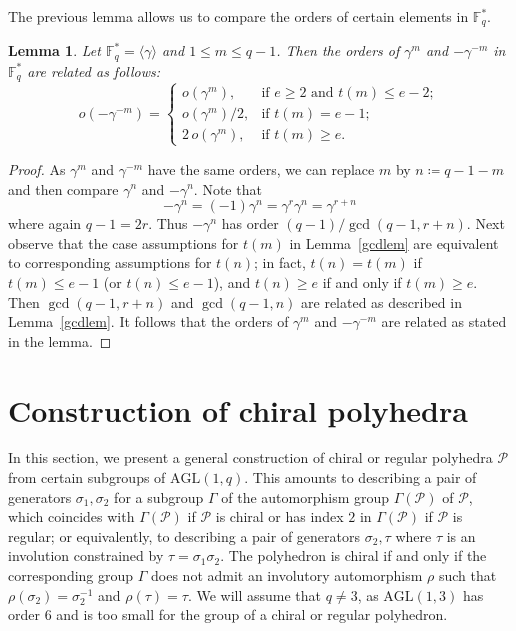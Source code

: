 \documentclass[12pt]{article}
\newtheorem{lemma}[theorem]{Lemma}
\theoremstyle{definition}\newtheorem{definition}{Definition}[section]
\begin{document}
The previous lemma allows us to compare the orders of certain elements in $\mathbb{F}_q^*$.

\begin{lemma}
\label{neggam}
Let $\mathbb{F}_q^*=\langle\gamma\rangle$ and $1\leq m\leq q-1$. Then the orders of $\gamma^m$ and $-\gamma^{-m}$ in $\mathbb{F}_q^*$ are related as follows: 
\[
	o(-\gamma^{-m}) = \begin{cases}
		o(\gamma^m), & \text{if $e \geq 2$ and $t(m) \leq e - 2$}; \\ 
		o(\gamma^m)/2, & \text{if $t(m) = e - 1$}; \\ 
		2\, o(\gamma^m), & \text{if $t(m) \geq e$}.
	\end{cases}
\]
\end{lemma}

\begin{proof}
As $\gamma^m$ and $\gamma^{-m}$ have the same orders, we can replace $m$ by $n\coloneqq q-1-m$ and then compare $\gamma^n$ and $-\gamma^n$. Note that
\[-\gamma^{n}=(-1)\gamma^{n}=\gamma^{r}\gamma^{n}=\gamma^{r+n}\]
where again $q-1=2r$. Thus $-\gamma^{n}$ has order $(q-1)/\gcd(q-1,r+n)$. Next observe that the case assumptions for $t(m)$ in Lemma~\ref{gcdlem} are equivalent to corresponding assumptions for $t(n)$; in fact, $t(n)=t(m)$ if $t(m)\leq e-1$ (or $t(n)\leq e-1$), and $t(n)\geq e$ if and only if $t(m)\geq e$. Then $\gcd(q-1,r+n)$ and $\gcd(q-1,n)$ are related as described in Lemma~\ref{gcdlem}. It follows that the orders of $\gamma^{m}$ and $-\gamma^{-m}$ are related as stated in the lemma.
\end{proof}

\section{Construction of chiral polyhedra}
\label{constr}

In this section, we present a general construction of chiral or regular polyhedra $\mathcal{P}$ from certain subgroups of $\mathrm{AGL}(1,q)$. This amounts to describing a pair of generators $\sigma_1,\sigma_2$ for a subgroup $\Gamma$ of the automorphism group $\Gamma(\mathcal{P})$ of $\mathcal{P}$, which coincides with $\Gamma(\mathcal{P})$ if $\mathcal{P}$ is chiral or has index $2$ in $\Gamma(\mathcal{P})$ if $\mathcal{P}$ is regular; or equivalently, to describing a pair of generators $\sigma_2,\tau$ where $\tau$ is an involution constrained by $\tau=\sigma_1\sigma_2$. The polyhedron is chiral if and only if the corresponding group $\Gamma$ does not admit an involutory automorphism $\rho$ such that $\rho(\sigma_{2})=\sigma_2^{-1}$ and $\rho(\tau)=\tau$. We will assume that $q\neq 3$, as $\mathrm{AGL}(1,3)$ has order 6 and is too small for the group of a chiral or regular polyhedron.
 
\end{document}
